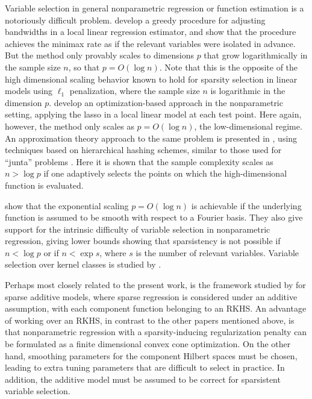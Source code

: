 Variable selection in general nonparametric regression or function
estimation is a notoriously difficult problem. \citet{lafferty2008rodeo} develop a greedy procedure for
adjusting bandwidths in a local linear regression estimator,
and show that the procedure achieves the minimax rate
as if the relevant variables were isolated in advance.
But the method only provably scales to dimensions $p$ that 
grow logarithmically in the sample size $n$, so that $p = O(\log n)$.  Note that this
is the opposite of the high dimensional scaling behavior
known to hold for sparsity selection in linear models
using $\ell_1$ penalization, where the sample size $n$
is logarithmic in the dimension $p$. \citet{bertin:08}
develop an optimization-based approach in
the nonparametric setting, applying the lasso
in a local linear model at each test point.  Here again,
however, the method only scales as $p = O(\log n)$,
the low-dimensional regime.
An approximation theory approach to the same
problem is presented in \cite{devore:11}, 
using techniques based on hierarchical hashing schemes,
similar to those used for ``junta'' problems \cite{mossel:04}.
Here it is shown that the sample complexity scales as $n > \log p$ 
if one adaptively selects the points on
which the high-dimensional function is evaluated.

\citet{dalalyan:12} show that the exponential scaling $p=O(\log n)$ is achievable if the underlying function is assumed to be smooth with respect to a Fourier basis. They also give
support for the intrinsic difficulty of variable
selection in nonparametric regression, giving lower bounds 
showing that sparsistency is not possible if $n < \log p$ or if $n <
\exp s$, where $s$ is the number of relevant variables.
Variable selection over kernel classes is studied
by \citet{Kolch:10}.  

Perhaps most closely related to the present work, is the framework
studied by \cite{Raskutti:12} for sparse additive models, where sparse
regression is considered under an additive assumption, with each
component function belonging to an RKHS.  An advantage of working over
an RKHS, in contrast to the other papers mentioned above, is that
nonparametric regression with a sparsity-inducing regularization penalty can be
formulated as a finite dimensional convex cone optimization.
On the other hand, 
smoothing parameters for the component Hilbert spaces
must be chosen, leading to extra tuning parameters
that are difficult to select in practice.  In addition, 
the additive model must be assumed to
be correct for sparsistent variable selection.

